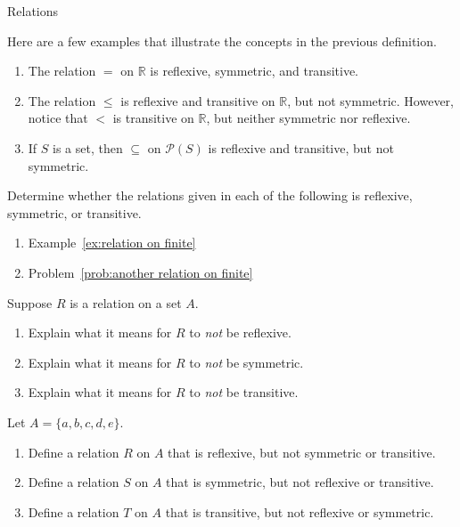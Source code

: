 \begin{section}{Relations}
\begin{example}
Here are a few examples that illustrate the concepts in the previous definition.
\begin{enumerate}[label=\textrm{(\alph*)}]
\item The relation $=$ on $\mathbb{R}$ is reflexive, symmetric, and transitive.
\item The relation $\leq$ is reflexive and transitive on $\mathbb{R}$, but not symmetric. However, notice that $<$ is transitive on $\mathbb{R}$, but neither symmetric nor reflexive.
\item If $S$ is a set, then $\subseteq$ on $\mathcal{P}(S)$ is reflexive and transitive, but not symmetric.
\end{enumerate}
\end{example}

\begin{problem}
Determine whether the relations given in each of the following is reflexive, symmetric, or transitive.
\begin{enumerate}[label=\textrm{(\alph*)}]
\item Example~\ref{ex:relation on finite}
\item Problem~\ref{prob:another relation on finite}
\end{enumerate}
\end{problem}

\begin{problem}
Suppose $R$ is a relation on a set $A$.
\begin{enumerate}[label=\textrm{(\alph*)}]
\item Explain what it means for $R$ to \emph{not} be reflexive.
\item Explain what it means for $R$ to \emph{not} be symmetric.
\item Explain what it means for $R$ to \emph{not} be transitive.
\end{enumerate}
\end{problem}

\begin{problem}
Let $A=\{a,b,c,d,e\}$.
\begin{enumerate}[label=\textrm{(\alph*)}]
\item Define a relation $R$ on $A$ that is reflexive, but not symmetric or transitive.
\item Define a relation $S$ on $A$ that is symmetric, but not reflexive or transitive.
\item Define a relation $T$ on $A$ that is transitive, but not reflexive or symmetric.
\end{enumerate}
\end{problem}


\end{section}
